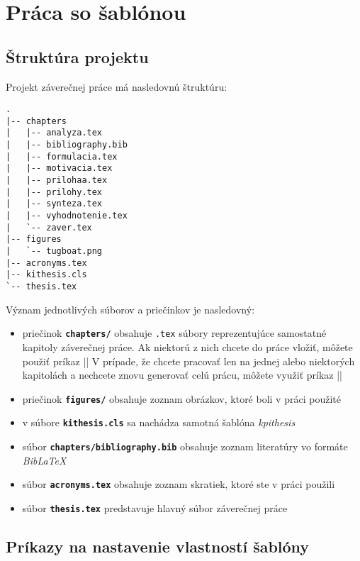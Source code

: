 
\chapter{Práca so šablónou}
\label{ch:sablona}

\section{Štruktúra projektu}

Projekt záverečnej práce má nasledovnú štruktúru:

\begin{verbatim}
.
|-- chapters
|   |-- analyza.tex
|   |-- bibliography.bib
|   |-- formulacia.tex
|   |-- motivacia.tex
|   |-- prilohaa.tex
|   |-- prilohy.tex
|   |-- synteza.tex
|   |-- vyhodnotenie.tex
|   `-- zaver.tex
|-- figures
|   `-- tugboat.png
|-- acronyms.tex
|-- kithesis.cls
`-- thesis.tex
\end{verbatim}

Význam jednotlivých súborov a priečinkov je nasledovný:

\begin{itemize}
    \item priečinok {\tt \bf{chapters/}} obsahuje {\tt .tex} súbory reprezentujúce samostatné kapitoly záverečnej práce. Ak niektorú z nich chcete do práce vložiť, môžete použiť príkaz || V prípade, že chcete pracovať len na jednej alebo niektorých kapitolách a nechcete znovu generovať celú prácu, môžete využiť príkaz ||
    \item priečinok {\tt \bf{figures/}} obsahuje zoznam obrázkov, ktoré boli v práci použité
    \item v súbore {\tt \bf{kithesis.cls}} sa nachádza samotná šablóna \emph{kpithesis}
    \item súbor {\tt \bf{chapters/bibliography.bib}} obsahuje zoznam literatúry vo formáte \emph{BibLaTeX}
    \item súbor {\tt \bf{acronyms.tex}} obsahuje zoznam skratiek, ktoré ste v práci použili
    \item súbor {\tt \bf{thesis.tex}} predstavuje hlavný súbor záverečnej práce
\end{itemize}


\section{Príkazy na nastavenie vlastností šablóny}

